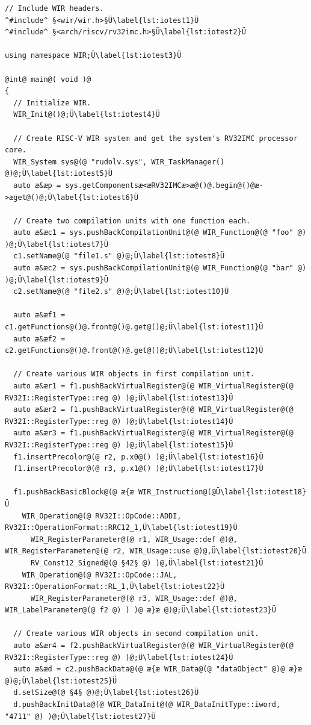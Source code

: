 \begin{lstlisting}[style=code,float=!ht,caption={Simple WIR Program Showing Stream Output},label=lst:iotest]
// Include WIR headers.
^#include^ §<wir/wir.h>§Ü\label{lst:iotest1}Ü
^#include^ §<arch/riscv/rv32imc.h>§Ü\label{lst:iotest2}Ü

using namespace WIR;Ü\label{lst:iotest3}Ü

@int@ main@( void )@
{
  // Initialize WIR.
  WIR_Init@()@;Ü\label{lst:iotest4}Ü

  // Create RISC-V WIR system and get the system's RV32IMC processor core.
  WIR_System sys@(@ "rudolv.sys", WIR_TaskManager() @)@;Ü\label{lst:iotest5}Ü
  auto æ&æp = sys.getComponentsæ<æRV32IMCæ>æ@()@.begin@()@æ->æget@()@;Ü\label{lst:iotest6}Ü

  // Create two compilation units with one function each.
  auto æ&æc1 = sys.pushBackCompilationUnit@(@ WIR_Function@(@ "foo" @) )@;Ü\label{lst:iotest7}Ü
  c1.setName@(@ "file1.s" @)@;Ü\label{lst:iotest8}Ü
  auto æ&æc2 = sys.pushBackCompilationUnit@(@ WIR_Function@(@ "bar" @) )@;Ü\label{lst:iotest9}Ü
  c2.setName@(@ "file2.s" @)@;Ü\label{lst:iotest10}Ü

  auto æ&æf1 = c1.getFunctions@()@.front@()@.get@()@;Ü\label{lst:iotest11}Ü
  auto æ&æf2 = c2.getFunctions@()@.front@()@.get@()@;Ü\label{lst:iotest12}Ü

  // Create various WIR objects in first compilation unit.
  auto æ&ær1 = f1.pushBackVirtualRegister@(@ WIR_VirtualRegister@(@ RV32I::RegisterType::reg @) )@;Ü\label{lst:iotest13}Ü
  auto æ&ær2 = f1.pushBackVirtualRegister@(@ WIR_VirtualRegister@(@ RV32I::RegisterType::reg @) )@;Ü\label{lst:iotest14}Ü
  auto æ&ær3 = f1.pushBackVirtualRegister@(@ WIR_VirtualRegister@(@ RV32I::RegisterType::reg @) )@;Ü\label{lst:iotest15}Ü
  f1.insertPrecolor@(@ r2, p.x0@() )@;Ü\label{lst:iotest16}Ü
  f1.insertPrecolor@(@ r3, p.x1@() )@;Ü\label{lst:iotest17}Ü

  f1.pushBackBasicBlock@(@ æ{æ WIR_Instruction@(@Ü\label{lst:iotest18}Ü
    WIR_Operation@(@ RV32I::OpCode::ADDI, RV32I::OperationFormat::RRC12_1,Ü\label{lst:iotest19}Ü
      WIR_RegisterParameter@(@ r1, WIR_Usage::def @)@, WIR_RegisterParameter@(@ r2, WIR_Usage::use @)@,Ü\label{lst:iotest20}Ü
      RV_Const12_Signed@(@ §42§ @) )@,Ü\label{lst:iotest21}Ü
    WIR_Operation@(@ RV32I::OpCode::JAL, RV32I::OperationFormat::RL_1,Ü\label{lst:iotest22}Ü
      WIR_RegisterParameter@(@ r3, WIR_Usage::def @)@, WIR_LabelParameter@(@ f2 @) ) )@ æ}æ @)@;Ü\label{lst:iotest23}Ü

  // Create various WIR objects in second compilation unit.
  auto æ&ær4 = f2.pushBackVirtualRegister@(@ WIR_VirtualRegister@(@ RV32I::RegisterType::reg @) )@;Ü\label{lst:iotest24}Ü
  auto æ&æd = c2.pushBackData@(@ æ{æ WIR_Data@(@ "dataObject" @)@ æ}æ @)@;Ü\label{lst:iotest25}Ü
  d.setSize@(@ §4§ @)@;Ü\label{lst:iotest26}Ü
  d.pushBackInitData@(@ WIR_DataInit@(@ WIR_DataInitType::iword, "4711" @) )@;Ü\label{lst:iotest27}Ü


\end{lstlisting}
